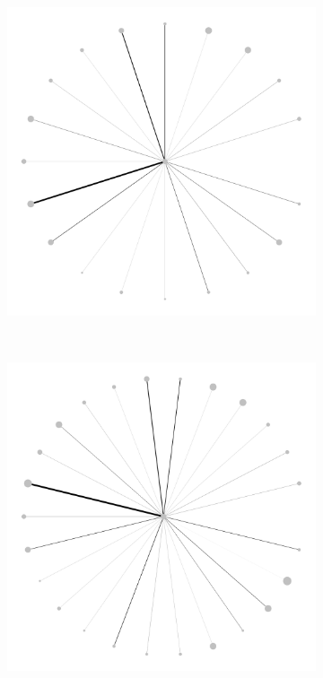 \documentclass[varwidth, border=0pt]{standalone}
\begin{document}
\begin{figure}
\begin{subfigure}{0.24\linewidth}
			\includegraphics[width=\linewidth]{../../graphics/evolution/reliance-de-wphg-2007.pdf}%
		\end{subfigure}~%
		\begin{subfigure}{0.24\linewidth}
			\centering
			\includegraphics[width=\linewidth]{../../graphics/evolution/reliance-de-wphg-2012.pdf}%

\end{subfigure}
\end{figure}
\end{document}
